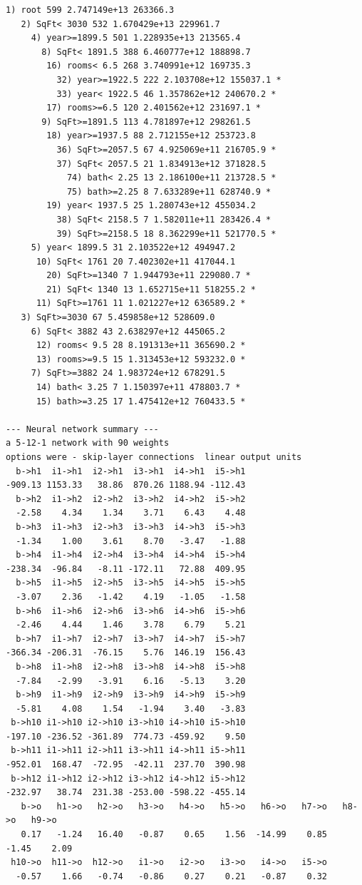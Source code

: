 \documentclass[11pt,a4paper]{article}
\begin{document}
\begin{lstlisting}[style=console]
 1) root 599 2.747149e+13 263366.3  
   2) SqFt< 3030 532 1.670429e+13 229961.7  
     4) year>=1899.5 501 1.228935e+13 213565.4  
       8) SqFt< 1891.5 388 6.460777e+12 188898.7  
        16) rooms< 6.5 268 3.740991e+12 169735.3  
          32) year>=1922.5 222 2.103708e+12 155037.1 *
          33) year< 1922.5 46 1.357862e+12 240670.2 *
        17) rooms>=6.5 120 2.401562e+12 231697.1 *
       9) SqFt>=1891.5 113 4.781897e+12 298261.5  
        18) year>=1937.5 88 2.712155e+12 253723.8  
          36) SqFt>=2057.5 67 4.925069e+11 216705.9 *
          37) SqFt< 2057.5 21 1.834913e+12 371828.5  
            74) bath< 2.25 13 2.186100e+11 213728.5 *
            75) bath>=2.25 8 7.633289e+11 628740.9 *
        19) year< 1937.5 25 1.280743e+12 455034.2  
          38) SqFt< 2158.5 7 1.582011e+11 283426.4 *
          39) SqFt>=2158.5 18 8.362299e+11 521770.5 *
     5) year< 1899.5 31 2.103522e+12 494947.2  
      10) SqFt< 1761 20 7.402302e+11 417044.1  
        20) SqFt>=1340 7 1.944793e+11 229080.7 *
        21) SqFt< 1340 13 1.652715e+11 518255.2 *
      11) SqFt>=1761 11 1.021227e+12 636589.2 *
   3) SqFt>=3030 67 5.459858e+12 528609.0  
     6) SqFt< 3882 43 2.638297e+12 445065.2  
      12) rooms< 9.5 28 8.191313e+11 365690.2 *
      13) rooms>=9.5 15 1.313453e+12 593232.0 *
     7) SqFt>=3882 24 1.983724e+12 678291.5  
      14) bath< 3.25 7 1.150397e+11 478803.7 *
      15) bath>=3.25 17 1.475412e+12 760433.5 *

--- Neural network summary ---
a 5-12-1 network with 90 weights
options were - skip-layer connections  linear output units 
  b->h1  i1->h1  i2->h1  i3->h1  i4->h1  i5->h1 
-909.13 1153.33   38.86  870.26 1188.94 -112.43 
  b->h2  i1->h2  i2->h2  i3->h2  i4->h2  i5->h2 
  -2.58    4.34    1.34    3.71    6.43    4.48 
  b->h3  i1->h3  i2->h3  i3->h3  i4->h3  i5->h3 
  -1.34    1.00    3.61    8.70   -3.47   -1.88 
  b->h4  i1->h4  i2->h4  i3->h4  i4->h4  i5->h4 
-238.34  -96.84   -8.11 -172.11   72.88  409.95 
  b->h5  i1->h5  i2->h5  i3->h5  i4->h5  i5->h5 
  -3.07    2.36   -1.42    4.19   -1.05   -1.58 
  b->h6  i1->h6  i2->h6  i3->h6  i4->h6  i5->h6 
  -2.46    4.44    1.46    3.78    6.79    5.21 
  b->h7  i1->h7  i2->h7  i3->h7  i4->h7  i5->h7 
-366.34 -206.31  -76.15    5.76  146.19  156.43 
  b->h8  i1->h8  i2->h8  i3->h8  i4->h8  i5->h8 
  -7.84   -2.99   -3.91    6.16   -5.13    3.20 
  b->h9  i1->h9  i2->h9  i3->h9  i4->h9  i5->h9 
  -5.81    4.08    1.54   -1.94    3.40   -3.83 
 b->h10 i1->h10 i2->h10 i3->h10 i4->h10 i5->h10 
-197.10 -236.52 -361.89  774.73 -459.92    9.50 
 b->h11 i1->h11 i2->h11 i3->h11 i4->h11 i5->h11 
-952.01  168.47  -72.95  -42.11  237.70  390.98 
 b->h12 i1->h12 i2->h12 i3->h12 i4->h12 i5->h12 
-232.97   38.74  231.38 -253.00 -598.22 -455.14 
   b->o   h1->o   h2->o   h3->o   h4->o   h5->o   h6->o   h7->o   h8->o   h9->o 
   0.17   -1.24   16.40   -0.87    0.65    1.56  -14.99    0.85   -1.45    2.09 
 h10->o  h11->o  h12->o   i1->o   i2->o   i3->o   i4->o   i5->o 
  -0.57    1.66   -0.74   -0.86    0.27    0.21   -0.87    0.32 


\end{lstlisting}
\end{document}

